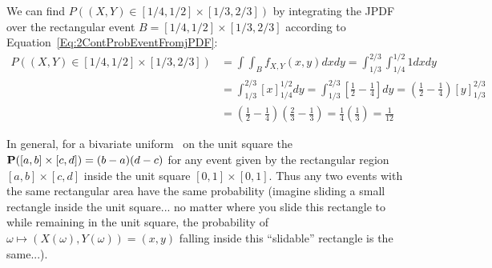 \begin{example}
\item We can find $P\left( (X,Y) \in [1/4,1/2]\times[1/3,2/3] \right)$ by integrating the JPDF over the rectangular event $B=[1/4,1/2]\times[1/3,2/3]$ according to Equation~\eqref{Eq:2ContProbEventFromjPDF}:
{\small
\begin{align*}
P\left( (X,Y) \in [1/4,1/2]\times[1/3,2/3] \right)
&=\int\int_B f_{X,Y}(x,y)dxdy
=\int_{1/3}^{2/3}\int_{1/4}^{1/2} 1 dx dy\\
&=\int_{1/3}^{2/3} \left[ x \right]_{1/4}^{1/2}  dy
=\int_{1/3}^{2/3} \left[ \frac{1}{2}-\frac{1}{4} \right]  dy
=\left(\frac{1}{2}-\frac{1}{4}\right)\left[ y \right]_{1/3}^{2/3}\\ 
&=\left(\frac{1}{2}-\frac{1}{4}\right)\left( \frac{2}{3}-\frac{1}{3} \right) 
=\frac{1}{4} \left( \frac{1}{3} \right) =\frac{1}{12}
\end{align*}
}
\ee

In general, for a bivariate uniform \rv~on the unit square the $\mathbf{P}([a,b]\times[c,d]) = (b-a)(d-c)$ for any event given by the rectangular region $[a,b]\times[c,d]$ inside the unit square $[0,1]\times[0,1]$.  
Thus any two events with the same rectangular area have the same probability (imagine sliding a small rectangle inside the unit square... no matter where you slide this rectangle to while remaining in the unit square, the probability of $\omega \mapsto (X(\omega),Y(\omega))=(x,y)$ falling inside this ``slidable'' rectangle is the same...).
\end{example}
 

